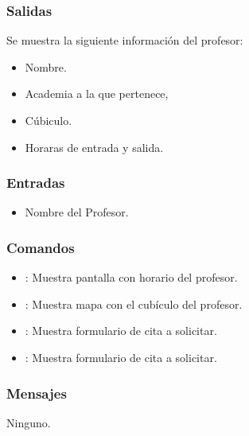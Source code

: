 
\subsubsection{Salidas}
	Se muestra la siguiente información del profesor:
	\begin{itemize}
		\item Nombre.
		\item Academia a la que pertenece,
		\item Cúbiculo.
		\item Horaras de entrada y salida. 
	\end{itemize}

\subsubsection{Entradas}

\begin{itemize}
	\item Nombre del Profesor.
\end{itemize}

\subsubsection{Comandos}
\begin{itemize}
	\item {}: Muestra pantalla con horario del profesor.
	\item {}: Muestra mapa con el cubículo del profesor.
	\item {}: Muestra formulario de cita a solicitar.
	\item {}: Muestra formulario de cita a solicitar.
\end{itemize}

\subsubsection{Mensajes}
\begin{Citemize}
	\item Ninguno.
\end{Citemize}


